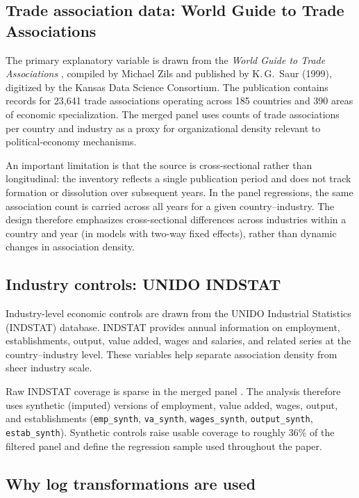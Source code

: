 \documentclass[12pt,letterpaper]{article}
\begin{document}
\subsection{Trade association data: World Guide to Trade Associations}

The primary explanatory variable is drawn from the \textit{World Guide to Trade Associations} \citep{zils1999}, compiled by Michael Zils and published by K.\,G.~Saur (1999), digitized by the Kansas Data Science Consortium. The publication contains records for 23,641 trade associations operating across 185 countries and 390 areas of economic specialization. The merged panel uses counts of trade associations per country and industry as a proxy for organizational density relevant to political-economy mechanisms.

An important limitation is that the source is cross-sectional rather than longitudinal: the inventory reflects a single publication period and does not track formation or dissolution over subsequent years. In the panel regressions, the same association count is carried across all years for a given country--industry. The design therefore emphasizes cross-sectional differences across industries within a country and year (in models with two-way fixed effects), rather than dynamic changes in association density.

\subsection{Industry controls: UNIDO INDSTAT}

Industry-level economic controls are drawn from the UNIDO Industrial Statistics (INDSTAT) database. INDSTAT provides annual information on employment, establishments, output, value added, wages and salaries, and related series at the country--industry level. These variables help separate association density from sheer industry scale.

Raw INDSTAT coverage is sparse in the merged panel \citep{unido2024}. The analysis therefore uses synthetic (imputed) versions of employment, value added, wages, output, and establishments (\texttt{emp\_synth}, \texttt{va\_synth}, \texttt{wages\_synth}, \texttt{output\_synth}, \texttt{estab\_synth}). Synthetic controls raise usable coverage to roughly 36\% of the filtered panel and define the regression sample used throughout the paper.

\subsection{Why log transformations are used}
\end{document}
